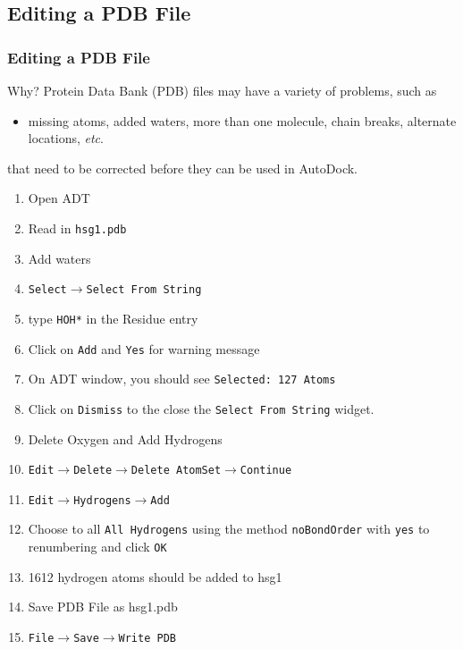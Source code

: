 \documentclass[slidestop,mathserif,compress,xcolor=svgnames]{beamer}
\newenvironment{eblock}[0]
{
\begin{beamerboxesrounded}[upper=uppercol2,lower=lowercol2,shadow=true]}
{\end{beamerboxesrounded}}
\begin{document}
\subsection{Editing a PDB File}
\begin{frame}[allowframebreaks]
  \frametitle{\small Editing a PDB File}
  \begin{block}{Why?}
    Protein Data Bank (PDB) files may have a variety of problems, such as
    \begin{itemize}
      \item missing atoms, added waters, more than one molecule, chain breaks, alternate locations, \emph{etc}.
    \end{itemize}
    that need to be corrected before they can be used in AutoDock.
  \end{block}

  \begin{eblock}{}
    \begin{enumerate}
      \item Open ADT
      \item Read in \texttt{hsg1.pdb}
      \item Add waters
      \item[] \texttt{Select$\rightarrow$Select From String}
      \item[] type \texttt{HOH*} in the Residue entry
      \item[] Click on \texttt{Add} and \texttt{Yes} for warning message
      \item[] On ADT window, you should see \texttt{Selected: 127 Atoms}
      \item Click on \texttt{Dismiss} to the close the \texttt{Select From String} widget.
      \item Delete Oxygen and Add Hydrogens
      \item[] \texttt{Edit$\rightarrow$Delete$\rightarrow$Delete AtomSet$\rightarrow$Continue}
      \item[] \texttt{Edit$\rightarrow$Hydrogens$\rightarrow$Add}
      \item Choose to all \texttt{All Hydrogens} using the method \texttt{noBondOrder} with \texttt{yes} to renumbering and click \texttt{OK}
      \item[] 1612 hydrogen atoms should be added to hsg1
      \item Save PDB File as hsg1.pdb
      \item[]\texttt{File$\rightarrow$Save$\rightarrow$Write PDB}
    \end{enumerate}
  \end{eblock}
\end{frame}
\end{document}

